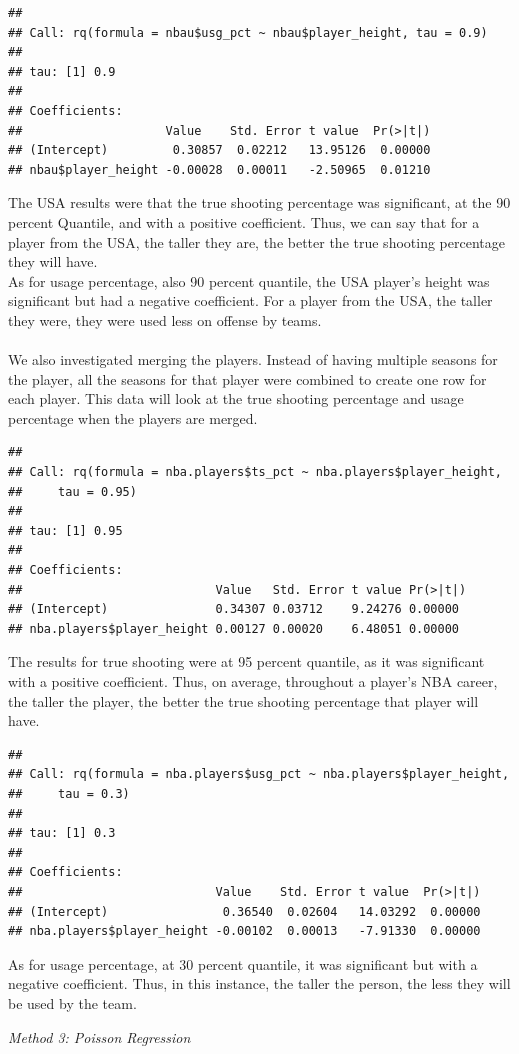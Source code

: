 \documentclass[11pt,letterpaper]{amsart}
\begin{document}
\begin{verbatim}
## 
## Call: rq(formula = nbau$usg_pct ~ nbau$player_height, tau = 0.9)
## 
## tau: [1] 0.9
## 
## Coefficients:
##                    Value    Std. Error t value  Pr(>|t|)
## (Intercept)         0.30857  0.02212   13.95126  0.00000
## nbau$player_height -0.00028  0.00011   -2.50965  0.01210
\end{verbatim}\leavevmode \newline
\indent The USA results were that the true shooting percentage was significant, at the 90 percent Quantile, and with a positive coefficient. Thus, we can say that for a player from the USA, the taller they are, the better the true shooting percentage they will have.\\
\indent As for usage percentage, also 90 percent quantile, the USA player’s height was significant but had a negative coefficient. For a player from the USA, the taller they were, they were used less on offense by teams.\\\\
\indent We also investigated merging the players. Instead of having multiple seasons for the player, all the seasons for that player were combined to create one row for each player. This data will look at the true shooting percentage and usage percentage when the players are merged. \\
\begin{verbatim}
## 
## Call: rq(formula = nba.players$ts_pct ~ nba.players$player_height, 
##     tau = 0.95)
## 
## tau: [1] 0.95
## 
## Coefficients:
##                           Value   Std. Error t value Pr(>|t|)
## (Intercept)               0.34307 0.03712    9.24276 0.00000 
## nba.players$player_height 0.00127 0.00020    6.48051 0.00000
\end{verbatim}\leavevmode \newline
\indent The results for true shooting were at 95 percent quantile, as it was significant with a positive coefficient. Thus, on average, throughout a player's NBA career, the taller the player, the better the true shooting percentage that player will have.

\begin{verbatim}
## 
## Call: rq(formula = nba.players$usg_pct ~ nba.players$player_height, 
##     tau = 0.3)
## 
## tau: [1] 0.3
## 
## Coefficients:
##                           Value    Std. Error t value  Pr(>|t|)
## (Intercept)                0.36540  0.02604   14.03292  0.00000
## nba.players$player_height -0.00102  0.00013   -7.91330  0.00000
\end{verbatim} \leavevmode \newline
\indent As for usage percentage, at 30 percent quantile, it was significant but with a negative coefficient. Thus, in this instance, the taller the person, the less they will be used by the team.\\
\newpage
\begin{center}
\emph{{\LARGE Method 3: Poisson Regression}}
\end{center} \leavevmode \newline
\end{document}
